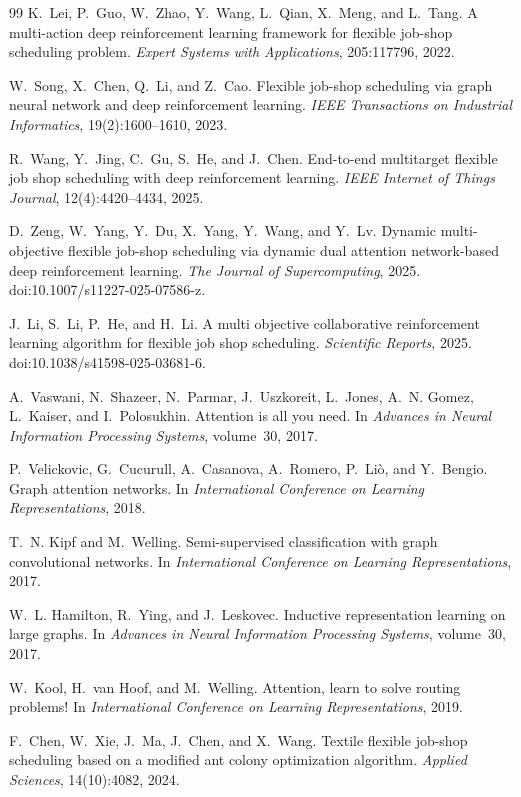 \begin{thebibliography}{99}
K.~Lei, P.~Guo, W.~Zhao, Y.~Wang, L.~Qian, X.~Meng, and L.~Tang.
A multi-action deep reinforcement learning framework for flexible job-shop scheduling problem.
\emph{Expert Systems with Applications}, 205:117796, 2022.

W.~Song, X.~Chen, Q.~Li, and Z.~Cao.
Flexible job-shop scheduling via graph neural network and deep reinforcement learning.
\emph{IEEE Transactions on Industrial Informatics}, 19(2):1600--1610, 2023.

R.~Wang, Y.~Jing, C.~Gu, S.~He, and J.~Chen.
End-to-end multitarget flexible job shop scheduling with deep reinforcement learning.
\emph{IEEE Internet of Things Journal}, 12(4):4420--4434, 2025.

D.~Zeng, W.~Yang, Y.~Du, X.~Yang, Y.~Wang, and Y.~Lv.
Dynamic multi-objective flexible job-shop scheduling via dynamic dual attention network-based deep reinforcement learning.
\emph{The Journal of Supercomputing}, 2025.
doi:10.1007/s11227-025-07586-z.

J.~Li, S.~Li, P.~He, and H.~Li.
A multi objective collaborative reinforcement learning algorithm for flexible job shop scheduling.
\emph{Scientific Reports}, 2025.
doi:10.1038/s41598-025-03681-6.

A.~Vaswani, N.~Shazeer, N.~Parmar, J.~Uszkoreit, L.~Jones, A.~N. Gomez, L.~Kaiser, and I.~Polosukhin.
Attention is all you need.
In \emph{Advances in Neural Information Processing Systems}, volume~30, 2017.

P.~Velickovic, G.~Cucurull, A.~Casanova, A.~Romero, P.~Li\`o, and Y.~Bengio.
Graph attention networks.
In \emph{International Conference on Learning Representations}, 2018.

T.~N. Kipf and M.~Welling.
Semi-supervised classification with graph convolutional networks.
In \emph{International Conference on Learning Representations}, 2017.

W.~L. Hamilton, R.~Ying, and J.~Leskovec.
Inductive representation learning on large graphs.
In \emph{Advances in Neural Information Processing Systems}, volume~30, 2017.

W.~Kool, H.~van Hoof, and M.~Welling.
Attention, learn to solve routing problems!
In \emph{International Conference on Learning Representations}, 2019.

F.~Chen, W.~Xie, J.~Ma, J.~Chen, and X.~Wang.
Textile flexible job-shop scheduling based on a modified ant colony optimization algorithm.
\emph{Applied Sciences}, 14(10):4082, 2024.


\end{thebibliography}
